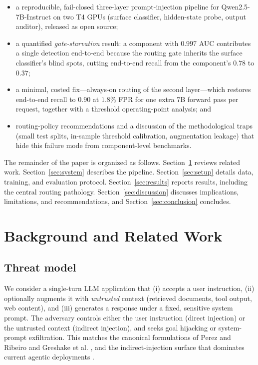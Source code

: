 \documentclass[conference]{IEEEtran}
\begin{document}
\begin{itemize}
  \item a reproducible, fail-closed three-layer prompt-injection pipeline for
        Qwen2.5-7B-Instruct on two T4 GPUs (surface classifier, hidden-state
        probe, output auditor), released as open source;
  \item a quantified \emph{gate-starvation} result: a component with $0.997$
        AUC contributes a single detection end-to-end because the routing gate
        inherits the surface classifier's blind spots, cutting end-to-end recall
        from the component's $0.78$ to $0.37$;
  \item a minimal, costed fix---always-on routing of the second layer---which
        restores end-to-end recall to $0.90$ at $1.8\%$ FPR for one extra
        7B forward pass per request, together with a threshold operating-point
        analysis; and
  \item routing-policy recommendations and a discussion of the methodological
        traps (small test splits, in-sample threshold calibration, augmentation
        leakage) that hide this failure mode from component-level benchmarks.
\end{itemize}

The remainder of the paper is organized as follows. Section~\ref{sec:related}
reviews related work. Section~\ref{sec:system} describes the pipeline.
Section~\ref{sec:setup} details data, training, and evaluation protocol.
Section~\ref{sec:results} reports results, including the central routing
pathology. Section~\ref{sec:discussion} discusses implications, limitations,
and recommendations, and Section~\ref{sec:conclusion} concludes.

\section{Background and Related Work}
\label{sec:related}

\subsection{Threat model}
\label{sec:threat}
We consider a single-turn LLM application that (i) accepts a user instruction,
(ii) optionally augments it with \emph{untrusted} context (retrieved documents,
tool output, web content), and (iii) generates a response under a fixed,
sensitive system prompt. The adversary controls either the user instruction
(direct injection) or the untrusted context (indirect injection), and seeks
goal hijacking or system-prompt exfiltration. This matches the canonical
formulations of Perez and Ribeiro \cite{perez2022} and Greshake et al.
\cite{greshake2023}, and the indirect-injection surface that dominates current
agentic deployments \cite{greshake2023,liu2024}.
\end{document}
